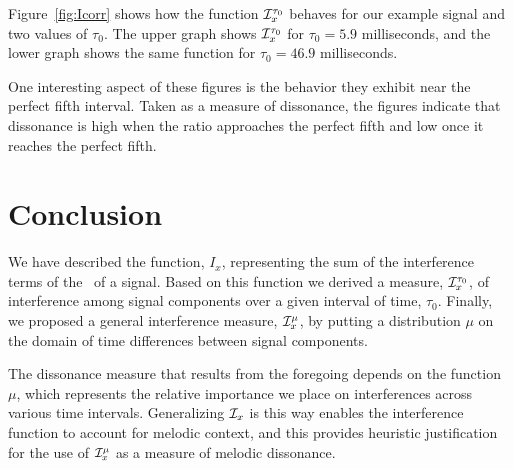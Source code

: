 Figure~\ref{fig:Icorr} shows how the function $\mathcal{I}_x^{\tau_0}$ behaves for our
example signal and two values of $\tau_0$.  The upper graph shows
$\mathcal{I}_x^{\tau_0}$ for $\tau_0 = 5.9$ milliseconds, and the lower graph shows
the same function for $\tau_0 = 46.9$ milliseconds.  

One interesting aspect of these figures is the behavior they exhibit near
the perfect fifth interval.  Taken as a measure of dissonance, the figures
indicate that dissonance is high when the ratio approaches the perfect fifth
and low once it reaches the perfect fifth. 


\section{Conclusion}
We have described the function, $I_x$, representing the sum of the
interference terms of the \WT\ of a signal. %
Based
on this function we derived a measure, $\mathcal{I}_x^{\tau_0}$, of interference among
signal components over a given interval of time, $\tau_0$.  Finally, we
proposed a general interference measure, $\mathcal{I}_x^{\mu}$, by putting a distribution
$\mu$ on the domain of time differences between signal components.  

The dissonance measure that results from the foregoing depends on the function
$\mu$, which represents the relative importance we place on interferences
across various time intervals.  Generalizing $\mathcal{I}_x$ is this way enables
the interference function to account for melodic context, and this provides
heuristic justification for the use of $\mathcal{I}_x^{\mu}$ as a measure of melodic
dissonance.

